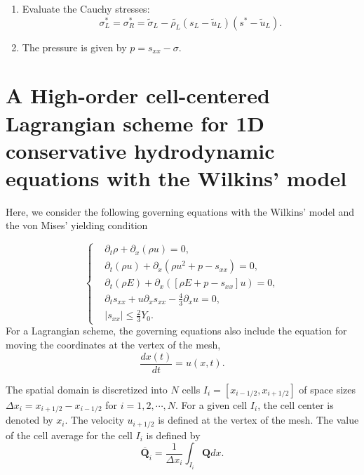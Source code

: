\documentclass[review]{elsarticle}
\begin{document}
\begin{enumerate}
\begin{enumerate}
    \item Evaluate the Cauchy stresses:
\begin{equation*}
  \sigma_L^*=\sigma_R^*=\widetilde{\sigma}_L -\widetilde{\rho_L} (s_L-\widetilde{u}_L)(s^*-\widetilde{u}_L).
\end{equation*}

     \item The pressure is given by $p =s_{xx}-\sigma$.
  \end{enumerate}
\end{enumerate}

 \section{ A High-order cell-centered Lagrangian scheme for 1D  conservative hydrodynamic equations with the Wilkins' model}
Here, we consider the following governing equations with the  Wilkins' model  and  the von Mises' yielding condition

\begin{equation}\label{eq:gveq}
   \left\{ \begin{aligned}
       & \partial _t \rho +\partial_x(\rho u)=0,\\
       & \partial _t (\rho u)+\partial_x(\rho u^2 + p -s_{xx})=0,\\
       &\partial _t (\rho E)+\partial_x([\rho E + p -s_{xx}]u)=0,\\
       &\partial _t s_{xx}+u\partial_xs_{xx}-\frac{4}{3}\partial_x u=0,\\
& |s_{xx}|\leq\frac{2}{3}Y_{0}.
       \end{aligned}\right.
\end{equation}
For a Lagrangian scheme, the governing equations also include the equation for moving the coordinates at the vertex of the mesh,
\begin{equation}\label{eq:dxt}
  \frac{dx(t)}{dt} = u(x,t).
\end{equation}

The spatial domain is discretized into $N$ cells $I_i = [x_{i-1/2}, x_{i+1/2}]$ of space sizes $\Delta x_i = x_{i+1/2} - x_{i-1/2}$ for $i = 1,2,\cdots,N$. For a given cell $I_i$, the cell center is denoted by $x_i$. The velocity $u_{i+1/2}$ is defined at the vertex of the mesh. The  value of the cell average for the cell $I_i$ is defined by
\begin{equation}
  \overline{\mathbf{Q}}_i = \frac{1}{\Delta x_i} \int_{I_i} \mathbf{Q} dx.
\end{equation}
\end{document}
